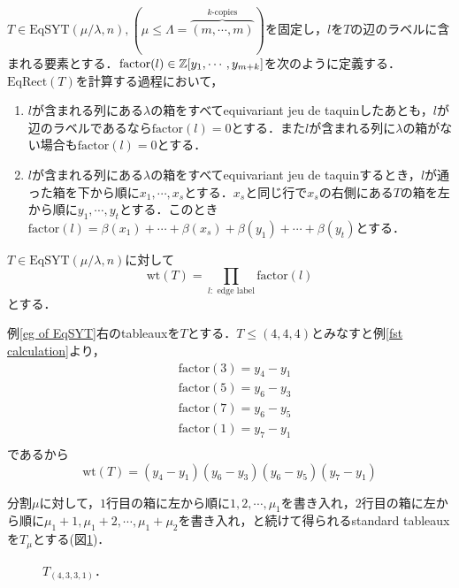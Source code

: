\begin{defin}
  $T\in\text{EqSYT}(\mu/\lambda, n), (\mu\leq\Lambda=\overbrace{(m,\cdots,m)}^{k\text{-copies}})$を固定し，$l$を$T$の辺のラベルに含まれる要素とする．$\text{factor}(l)\in\mathbb{Z}[y_1,\cdots,y_{m+k}]$を次のように定義する．$\text{EqRect}(T)$を計算する過程において，
  \begin{enumerate}
    \item $l$が含まれる列にある$\lambda$の箱をすべてequivariant jeu de taquinしたあとも，$l$が辺のラベルであるなら$\text{factor}(l)=0$とする．また$l$が含まれる列に$\lambda$の箱がない場合も$\text{factor}(l)=0$とする．
    \item $l$が含まれる列にある$\lambda$の箱をすべてequivariant jeu de taquinするとき，$l$が通った箱を下から順に$x_1,\cdots,x_s$とする．$x_s$と同じ行で$x_s$の右側にある$T$の箱を左から順に$y_1,\cdots,y_t$とする．このとき$\text{factor}(l)=\beta(x_1)+\cdots+\beta(x_s)+\beta(y_1)+\cdots+\beta(y_t)$とする．
  \end{enumerate}
\end{defin}

\begin{defin}
  $T\in\text{EqSYT}(\mu/\lambda, n)$に対して
  \[
  \text{wt}(T)=\prod_{l:\text{ edge label}}\text{factor}(l)
  \]
  とする．
\end{defin}

\begin{eg}
  例\ref{eg of EqSYT}右のtableauxを$T$とする．$T\leq (4,4,4)$とみなすと例\ref{fst calculation}より，
\begin{align*}
  &\text{factor}(3)=y_4-y_1\\
  &\text{factor}(5)=y_6-y_3\\
  &\text{factor}(7)=y_6-y_5\\
  &\text{factor}(1)=y_7-y_1\\
\end{align*}
  であるから
  \[
  \text{wt}(T)=(y_4-y_1)(y_6-y_3)(y_6-y_5)(y_7-y_1)
  \]
\end{eg}


分割$\mu$に対して，$1$行目の箱に左から順に$1,2,\cdots,\mu_1$を書き入れ，$2$行目の箱に左から順に$\mu_1+1,\mu_1+2,\cdots,\mu_1+\mu_2$を書き入れ，と続けて得られるstandard tableauxを$T_\mu$とする(図\ref{superstandard})．
\begin{figure}
  \centering
  \caption{$T_{(4,3,3,1)}$．}\label{superstandard}
\end{figure}

